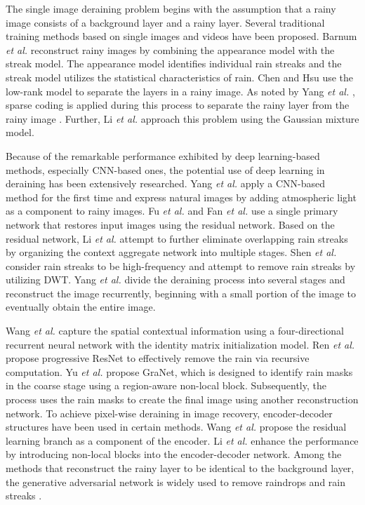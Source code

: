 \documentclass[a4paper,fleqn]{cas-dc}
\begin{document}
The single image deraining problem begins with the assumption that a rainy image consists of a background layer and a rainy layer. Several traditional training methods based on single images and videos have been proposed. Barnum \textit{et al.} \cite{barnum2010analysis} reconstruct rainy images by combining the appearance model with the streak model. The appearance model identifies individual rain streaks and the streak model utilizes the statistical characteristics of rain. Chen and Hsu \cite{chen2013generalized} use the low-rank model to separate the layers in a rainy image. As noted by Yang \textit{et al.} \cite{yang2019single}, sparse coding is applied during this process to separate the rainy layer from the rainy image \cite{deng2018directional, kang2011automatic, luo2015removing, wang2017hierarchical, zhu2017joint}. Further, Li \textit{et al.} \cite{bossu2011rain, li2016rain} approach this problem using the Gaussian mixture model.

 Because of the remarkable performance exhibited by deep learning-based methods, especially CNN-based ones, the potential use of deep learning in deraining has been extensively researched. Yang \textit{et al.} \cite{yang2017deep} apply a CNN-based method for the first time and express natural images by adding atmospheric light as a component to rainy images. Fu \textit{et al.} \cite{fu2017removing} and Fan \textit{et al.} \cite{fan2018residual} use a single primary network that restores input images using the residual network. Based on the residual network, Li \textit{et al.} \cite{li2018recurrent} attempt to further eliminate overlapping rain streaks by organizing the context aggregate network into multiple stages. Shen \textit{et al.} \cite{shen2018deep} consider rain streaks to be high-frequency and attempt to remove rain streaks by utilizing DWT. Yang \textit{et al.} \cite{yang2019scale} divide the deraining process into several stages and reconstruct the image recurrently, beginning with a small portion of the image to eventually obtain the entire image. 
 
Wang \textit{et al.} \cite{wang2019spatial} capture the spatial contextual information using a four-directional recurrent neural network with the identity matrix initialization model. Ren \textit{et al.} \cite{ren2019progressive} propose progressive ResNet to effectively remove the rain via recursive computation. Yu \textit{et al.} \cite{yu2019gradual} propose GraNet, which is designed to identify rain masks in the coarse stage using a region-aware non-local block. Subsequently, the process uses the rain masks to create the final image using another reconstruction network. To achieve pixel-wise deraining in image recovery, encoder-decoder structures have been used in certain methods. Wang \textit{et al.} \cite{wang2019erl} propose the residual learning branch as a component of the encoder. Li \textit{et al.} \cite{ li2018non} enhance the performance by introducing non-local blocks into the encoder-decoder network. Among the methods that reconstruct the rainy layer to be identical to the background layer, the generative adversarial network is widely used to remove raindrops and rain streaks \cite{ li2019heavy, qian2018attentive, zhang2019image}.
\end{document}
